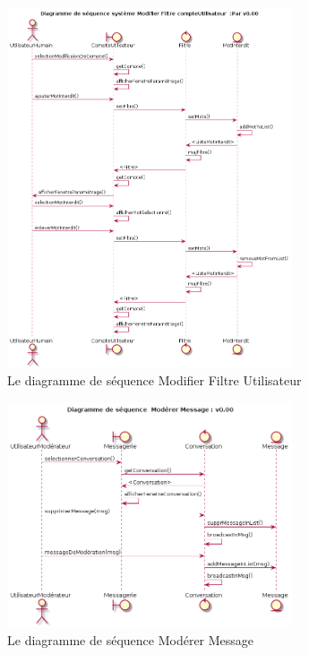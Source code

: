 \documentclass[11pt,dvipsnames,svgnames]{report}
\begin{document}
\begin{figure}[H]
\centerline{\includegraphics[width=0.75\textwidth]{diagrammes/Filtre-DSS.png}}
\caption{Le diagramme de séquence \og Modifier Filtre Utilisateur \fg}
\end{figure}

\begin{figure}[H]
\centerline{\includegraphics[width=0.75\textwidth]{diagrammes/ModererMessage-DSS.png}}
\caption{Le diagramme de séquence \og Modérer Message \fg}
\end{figure}
\end{document}
